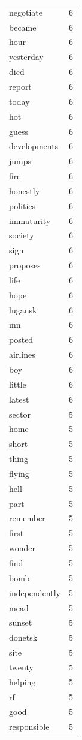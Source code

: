 \begin{tabular}{lr}
negotiate & 6 \\
became & 6 \\
hour & 6 \\
yesterday & 6 \\
died & 6 \\
report & 6 \\
today & 6 \\
hot & 6 \\
guess & 6 \\
developments & 6 \\
jumps & 6 \\
fire & 6 \\
honestly & 6 \\
politics & 6 \\
immaturity & 6 \\
society & 6 \\
sign & 6 \\
proposes & 6 \\
life & 6 \\
hope & 6 \\
lugansk & 6 \\
mn & 6 \\
posted & 6 \\
airlines & 6 \\
boy & 6 \\
little & 6 \\
latest & 6 \\
sector & 5 \\
home & 5 \\
short & 5 \\
thing & 5 \\
flying & 5 \\
hell & 5 \\
part & 5 \\
remember & 5 \\
first & 5 \\
wonder & 5 \\
find & 5 \\
bomb & 5 \\
independently & 5 \\
mead & 5 \\
sunset & 5 \\
donetsk & 5 \\
site & 5 \\
twenty & 5 \\
helping & 5 \\
rf & 5 \\
good & 5 \\
responsible & 5 \\

\end{tabular}
